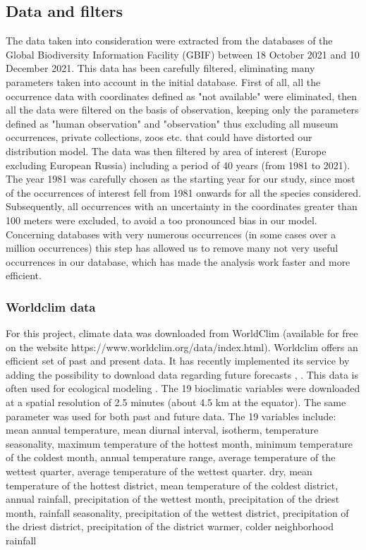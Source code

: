\documentclass[12pt,a4paper]{article}
\begin{document}
\subsection{Data and filters}
The data taken into consideration were extracted from the databases of the Global Biodiversity Information Facility (GBIF) \citep{gbif} between 18 October 2021 and 10 December 2021.
This data has been carefully filtered, eliminating many parameters taken into account in the initial database.
First of all, all the occurrence data with coordinates defined as "not available" were eliminated, then all the data were filtered on the basis of observation, keeping only the parameters defined as "human observation" and "observation" thus excluding all museum occurrences, private collections, zoos etc. that could have distorted our distribution model.
The data was then filtered by area of interest (Europe excluding European Russia) including a period of 40 years (from 1981 to 2021).
The year 1981 was carefully chosen as the starting year for our study, since most of the occurrences of interest fell from 1981 onwards for all the species considered.
Subsequently, all occurrences with an uncertainty in the coordinates greater than 100 meters were excluded, to avoid a too pronounced bias in our model.
Concerning databases with very numerous occurrences (in some cases over a million occurrences) this step has allowed us to remove many not very useful occurrences in our database, which has made the analysis work faster and more efficient.

\subsubsection{Worldclim data}

For this project, climate data was downloaded from WorldClim (available for free on the website https://www.worldclim.org/data/index.html).
Worldclim offers an efficient set of past and present data. It has recently implemented its service by adding the possibility to download data regarding future forecasts \citep{wc}, \citep{ey}. This data is often used for ecological modeling \citep{bcw}. 
The 19 bioclimatic variables were downloaded at a spatial resolution of 2.5 minutes (about 4.5 km at the equator). The same parameter was used for both past and future data.
The 19 variables include: mean annual temperature, mean diurnal interval, isotherm, temperature seasonality, maximum temperature of the hottest month, minimum temperature of the coldest month, annual temperature range, average temperature of the wettest quarter, average temperature of the wettest quarter. dry, mean temperature of the hottest district, mean temperature of the coldest district, annual rainfall, precipitation of the wettest month, precipitation of the driest month, rainfall seasonality, precipitation of the wettest district, precipitation of the driest district, precipitation of the district warmer, colder neighborhood rainfall 
\end{document}
